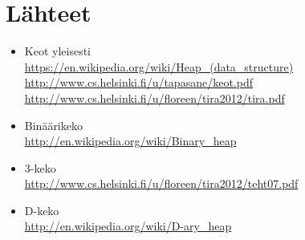 \documentclass[a4paper,12pt]{article}
\begin{document}
\section{Lähteet}
\begin{itemize}

\item Keot yleisesti\\
\url{https://en.wikipedia.org/wiki/Heap_(data_structure)}\\
\url{http://www.cs.helsinki.fi/u/tapasane/keot.pdf}\\
\url{http://www.cs.helsinki.fi/u/floreen/tira2012/tira.pdf}

\item Binäärikeko\\
\url{http://en.wikipedia.org/wiki/Binary_heap}

\item 3-keko\\
\url{http://www.cs.helsinki.fi/u/floreen/tira2012/teht07.pdf}

\item D-keko\\
\url{http://en.wikipedia.org/wiki/D-ary_heap}
\end{itemize}
\end{document}
